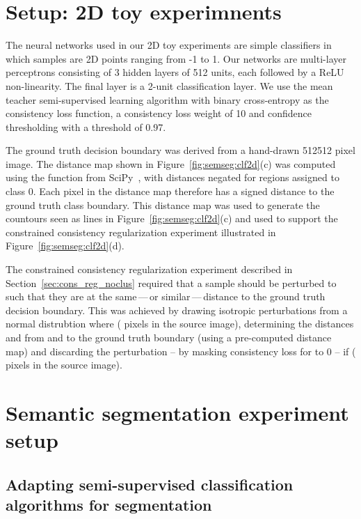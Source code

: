 \documentclass{bmvc2k}
\begin{document}
\section{Setup: 2D toy experimnents}


The neural networks used in our 2D toy experiments are simple classifiers in which samples are 2D  points ranging from -1 to 1. Our networks are multi-layer perceptrons consisting of 3 hidden layers of 512 units, each followed by a ReLU non-linearity. The final layer is a 2-unit classification layer. We use the mean teacher \citep{Tarvainen:MeanTeachers} semi-supervised learning algorithm with binary cross-entropy as the consistency loss function, a consistency loss weight of 10 and confidence thresholding \citep{French:SelfEnsDomAdapt} with a threshold of 0.97.

The ground truth decision boundary was derived from a hand-drawn 512512 pixel image. The distance map shown in Figure~\ref{fig:semseg:clf2d}(c) was computed using the  function from SciPy~\cite{SciPy}, with distances negated for regions assigned to class 0. Each pixel in the distance map therefore has a signed distance to the ground truth class boundary. This distance map was used to generate the countours seen as lines in Figure~\ref{fig:semseg:clf2d}(c) and used to support the constrained consistency regularization experiment illustrated in Figure~\ref{fig:semseg:clf2d}(d).

The constrained consistency regularization experiment described in Section~\ref{sec:cons_reg_noclus} required that a sample  should be perturbed to  such that they are at the same\,---\,or similar\,---\,distance to the ground truth decision boundary. This was achieved by drawing isotropic perturbations from a normal distrubtion  where  ( pixels in the source image), determining the distances  and  from  and  to the ground truth boundary (using a pre-computed distance map) and discarding the perturbation -- by masking consistency loss for  to 0 -- if  ( pixels in the source image).






\section{Semantic segmentation experiment setup}


\subsection{Adapting semi-supervised classification algorithms for segmentation}
\label{sec:supp:seg:adapt}
\end{document}
